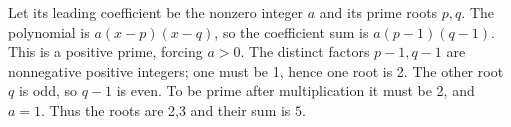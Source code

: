 Let its leading coefficient be the nonzero integer $a$ and its prime roots $p,q$. The polynomial is $a(x-p)(x-q)$, so the coefficient sum is $a(p-1)(q-1)$. This is a positive prime, forcing $a>0$. The distinct factors $p-1,q-1$ are nonnegative positive integers; one must be 1, hence one root is 2. The other root $q$ is odd, so $q-1$ is even. To be prime after multiplication it must be 2, and $a=1$. Thus the roots are 2,3 and their sum is $\boxed5$.
